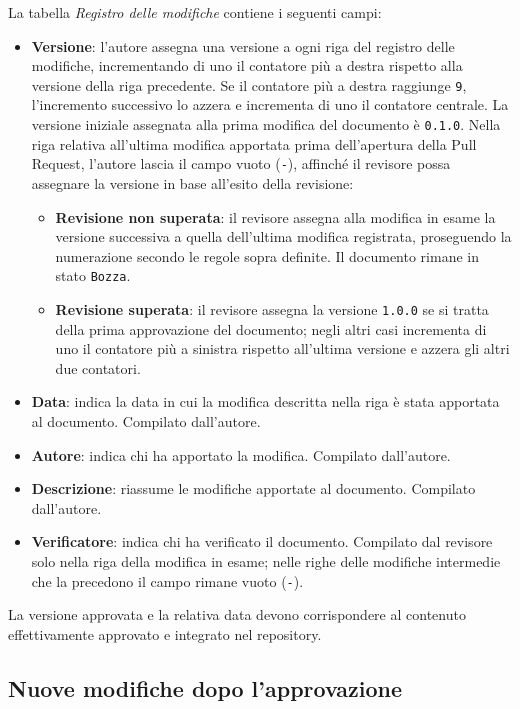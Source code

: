 \documentclass[11pt, a4paper]{article}
\begin{document}
La tabella \textit{Registro delle modifiche} contiene i seguenti campi:
\begin{itemize}
    \item \textbf{Versione}: l'autore assegna una versione a ogni riga del registro delle modifiche, incrementando di uno il contatore più a destra rispetto alla versione della riga precedente. Se il contatore più a destra raggiunge \texttt{9}, l'incremento successivo lo azzera e incrementa di uno il contatore centrale. La versione iniziale assegnata alla prima modifica del documento è \texttt{0.1.0}. Nella riga relativa all'ultima modifica apportata prima dell'apertura della Pull Request, l'autore lascia il campo vuoto (\texttt{-}), affinché il revisore possa assegnare la versione in base all'esito della revisione:
    \begin{itemize}
        \item \textbf{Revisione non superata}: il revisore assegna alla modifica in esame la versione successiva a quella dell'ultima modifica registrata, proseguendo la numerazione secondo le regole sopra definite. Il documento rimane in stato \texttt{Bozza}.
        \item \textbf{Revisione superata}: il revisore assegna la versione \texttt{1.0.0} se si tratta della prima approvazione del documento; negli altri casi incrementa di uno il contatore più a sinistra rispetto all'ultima versione e azzera gli altri due contatori.
    \end{itemize}
    \item \textbf{Data}: indica la data in cui la modifica descritta nella riga è stata apportata al documento. Compilato dall'autore.
    \item \textbf{Autore}: indica chi ha apportato la modifica. Compilato dall'autore.
    \item \textbf{Descrizione}: riassume le modifiche apportate al documento. Compilato dall'autore.
    \item \textbf{Verificatore}: indica chi ha verificato il documento. Compilato dal revisore solo nella riga della modifica in esame; nelle righe delle modifiche intermedie che la precedono il campo rimane vuoto (\texttt{-}).
\end{itemize}

\noindent La versione approvata e la relativa data devono corrispondere al contenuto effettivamente approvato e integrato nel repository.

\subsection{Nuove modifiche dopo l'approvazione}
\end{document}
